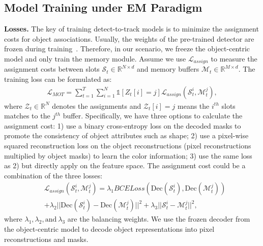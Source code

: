 \subsection{Model Training under EM Paradigm } 
\noindent \textbf{Losses.} The key of training detect-to-track models is to minimize the assignment costs for object associations. Usually, the weights of the pre-trained detector are frozen during training~\cite{cai2022memot,bergmann2019tracking}. Therefore, in our scenario, we freeze the object-centric model and only train the memory module.
Assume we use $\mathcal{L}_{assign}$ to   measure the assignment costs between  slots $\mathcal{S}_t \in \mathbb{R}^{N\times d}$ and memory buffers $\mathcal{M}_t \in \mathbb{R}^{M\times d}$.  The training loss can be formulated as:
\begin{gather}
\mathcal{L}_{MOT} = \sum_{t=1}^{T}\sum_{i=1}^{N} \mathds{1}[Z_t[i] = j]\mathcal{L}_{assign}(\mathcal{S}_t^i, \mathcal{M}_t^j),
\label{eq:1}
\end{gather}
where $\mathcal{Z}_t\in \mathbb{R}^{N}$ denotes the assignments and $\mathcal{Z}_t[i] = j$ means the $i^{th}$ slots matches to the $j^{th}$ buffer. Specifically, we have three options to calculate the assignment cost: 1) use a binary cross-entropy loss on the decoded masks to promote the consistency of object attributes such as shape; 2) use a pixel-wise squared reconstruction loss on the object reconstructions (pixel reconstructions multiplied by object masks) to learn the color information; 3) use the same loss as 2) but directly apply on the feature space. The assignment cost could be a combination of the three losses:
\begin{equation}
\begin{aligned}
    &\mathcal{L}_{assign}(\mathcal{S}_t^i, \mathcal{M}_t^j) = \lambda_1 BCELoss(\text{Dec}(\mathcal{S}_t^i),\text{Dec}(\mathcal{M}_t^j)) \\
    &+ \lambda_2 || \text{Dec}(\mathcal{S}_t^i)-\text{Dec}(\mathcal{M}_t^j)||^2 + \lambda_3 || \mathcal{S}_t^i-\mathcal{M}_t^j||^2,
\end{aligned}
\end{equation}
where $\lambda_1, \lambda_2, \text{and}\  \lambda_3$ are the balancing weights. We use the frozen decoder from the object-centric model to decode object representations into pixel reconstructions and masks.

